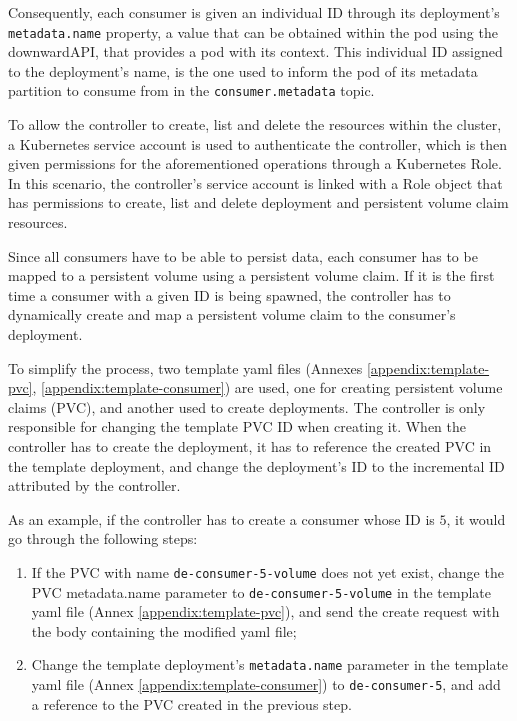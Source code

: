 Consequently, each consumer is given an individual ID through its deployment's
\lstinline{metadata.name} property, a value that can be obtained within the pod
using the downwardAPI, that provides a pod with its context. This individual ID
assigned to the deployment's name, is the one used to inform the pod of its
metadata partition to consume from in the \lstinline{consumer.metadata} topic.

To allow the controller to create, list and delete the resources within the
cluster, a Kubernetes service account is used to authenticate the controller,
which is then given permissions for the aforementioned operations through a
Kubernetes Role. In this scenario, the controller's service account is linked
with a Role object that has permissions to create, list and delete deployment
and persistent volume claim resources.

Since all consumers have to be able to persist data, each consumer has to be
mapped to a persistent volume using a persistent volume claim. If it is the
first time a consumer with a given ID is being spawned, the controller has to
dynamically create and map a persistent volume claim to the consumer's
deployment.

To simplify the process, two template yaml files (Annexes \ref{appendix:template-pvc},
\ref{appendix:template-consumer}) are used, one for creating persistent volume
claims (PVC), and another used to create deployments. The controller is only
responsible for changing the template PVC ID when creating it. When the
controller has to create the deployment, it has to reference the created PVC in
the template deployment, and change the deployment's ID to the incremental ID
attributed by the controller.

As an example, if the controller has to create a consumer whose ID is $5$, it
would go through the following steps: 
\begin{enumerate} 
    \item If the PVC with name \lstinline{de-consumer-5-volume} does not yet
        exist, change the PVC metadata.name parameter to
        \lstinline{de-consumer-5-volume} in the template yaml file
        (Annex \ref{appendix:template-pvc}), and send the create request with the body
        containing the modified yaml file;
    \item Change the template deployment's \lstinline{metadata.name} parameter
        in the template yaml file (Annex \ref{appendix:template-consumer}) to
        \lstinline{de-consumer-5}, and add a reference to the PVC created in the
        previous step.  
\end{enumerate}

